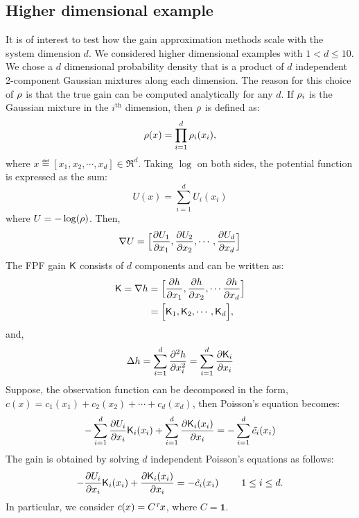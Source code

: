 \subsection*{Higher dimensional example}
It is of interest to test how the gain approximation methods scale with the system dimension $d$. We considered higher dimensional examples with $1<d \leq 10$.  
We chose a $d$ dimensional probability density that is a product of $d$ independent 2-component Gaussian mixtures along each dimension. The reason for this choice of $\rho$ is that the true gain can be computed analytically for any $d$. If $\rho_i$ is the Gaussian mixture in the $i^{\text{th}}$ dimension, then $\rho$ is defined as: 
\begin{equation}
\rho(x) = \prod_{i=1}^d \rho_i(x_i),
\end{equation}
where $x \eqdef [x_1, x_2, \cdots, x_d] \in \Re^d$. 
Taking $\log$ on both sides, the potential function is expressed as the sum:
\begin{equation}
U(x) = \sum_{i=1}^d U_i(x_i)
\end{equation}
where $U = -\log(\rho)$.
Then,
\begin{equation}
\nabla U = \Bigl[ \frac{\partial U_1}{\partial x_1}, \frac{\partial U_2}{\partial x_2}, \cdots , \frac{\partial U_d}{\partial x_d} \Bigr]
\end{equation}
The FPF gain $\text{\sf K}$ consists of $d$ components and can be written as: 
\begin{equation}
\begin{aligned}
\text{\sf K} = \nabla h & =  \Bigl[\frac{\partial h}{\partial x_1}, \frac{\partial h}{\partial x_2}, \cdots \frac{\partial h}{\partial x_d}\Bigr] \\
& = \Bigl[ \text{\sf K}_1, \text{\sf K}_2, \cdots, \text{\sf K}_d\Bigr],
\end{aligned}
\end{equation}
and, 
\begin{equation}
\Delta h = \sum_{i=1}^d \frac{\partial^2 h}{\partial x^2_i} = \sum_{i=1}^d \frac{\partial \text{\sf K}_i}{\partial x_i}
\end{equation}
Suppose, the observation function can be decomposed in the form, $c(x) = c_1(x_1) + c_2(x_2) + \cdots + c_d(x_d)$, then Poisson's equation becomes:
\begin{equation}
- \sum_{i=1}^d \frac{\partial U_i}{\partial x_i} \kFPF_i(x_i)+ \sum_{i=1}^d \frac{\partial \kFPF_i(x_i)}{\partial x_i} = -\sum_{i=1}^d \tilde{c_i}(x_i)
\label{e:fpf_multi}
\end{equation}
The gain is obtained by solving $d$ independent Poisson's equations as follows:
\begin{equation}
-\frac{\partial U_i}{\partial x_i} \text{\sf K}_i(x_i) + \frac{\partial \text{\sf K}_i(x_i)}{\partial x_i} = -\tilde{c_i}(x_i) \,\qquad\,  1 \leq i \leq d. 
\end{equation}
In particular, we consider $c(x) = C^{\hbox{\tiny\it T}} x$, where $C =\pmb{1}$. 

